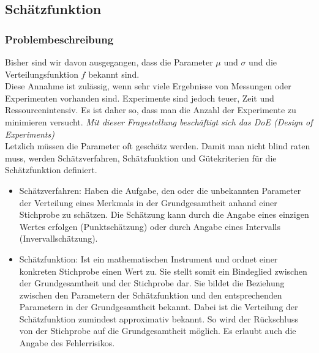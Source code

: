 \subsection{Schätzfunktion}
\subsubsection{Problembeschreibung}
Bisher sind wir davon ausgegangen, dass die Parameter $\mu$ und $\sigma$ und die Verteilungsfunktion $f$ bekannt sind.\\
Diese Annahme ist zulässig, wenn sehr viele Ergebnisse von Messungen oder Experimenten vorhanden sind. Experimente sind jedoch teuer, Zeit und Ressourcenintensiv. Es ist daher so, dass man die Anzahl der Experimente zu minimieren versucht. \textit{Mit dieser Fragestellung beschäftigt sich das DoE (Design of Experiments)}\\
Letzlich müssen die Parameter oft geschätz werden. Damit man nicht blind raten muss, werden Schätzverfahren, Schätzfunktion und Gütekriterien für die Schätzfunktion definiert.
\begin{itemize}
\item Schätzverfahren:
\subitem Haben die Aufgabe, den oder die unbekannten Parameter der Verteilung eines Merkmals in der Grundgesamtheit anhand einer Stichprobe zu schätzen.
\subitem Die Schätzung kann durch die Angabe eines einzigen Wertes erfolgen (Punktschätzung) oder durch Angabe eines Intervalls (Invervallschätzung).
\item Schätzfunktion:
\subitem Ist ein mathematischen Instrument und ordnet einer konkreten Stichprobe einen Wert zu. Sie stellt somit ein Bindeglied zwischen der Grundgesamtheit und der Stichprobe dar. Sie bildet die Beziehung zwischen den Parametern der Schätzfunktion und den entsprechenden Parametern in der Grundgesamtheit bekannt. Dabei ist die Verteilung der Schätzfunktion zumindest approximativ bekannt. So wird der Rückschluss von der Stichprobe auf die Grundgesamtheit möglich. Es erlaubt auch die Angabe des Fehlerrisikos.
\end{itemize}
